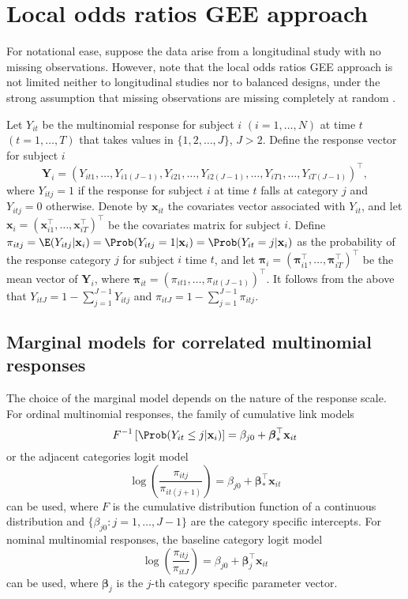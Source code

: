 \documentclass[article,shortnames,nojss]{jss}
\begin{document}
\section{Local odds ratios GEE approach} \label{GEENotation}
For notational ease, suppose the data arise from a longitudinal study with no missing observations. However, note that the local odds ratios GEE approach is not limited neither to longitudinal studies nor to balanced designs, under the strong assumption that missing observations are missing completely at random \citep{Rubin1976}.

Let $Y_{it}$ be the multinomial response for subject $i$ $(i=1,\ldots,N)$ at time $t$ $(t=1,\ldots,T)$ that takes values in $\{1,2,\ldots,J\}$, $J>2$. Define the response vector for subject $i$
$$\mathbf {Y}_{i}=(Y_{it1},\ldots,Y_{i1(J-1)},Y_{i21},\ldots,Y_{i2(J-1)},\ldots,Y_{iT1},\ldots,Y_{iT(J-1)})^{\top},$$ 
where $Y_{itj}=1$ if the response for subject $i$ at time $t$ falls at category $j$ and $Y_{itj}=0$ otherwise. Denote by $\mathbf{x}_{it}$ the covariates vector associated with $Y_{it}$, and let $\mathbf x_{i}=(\mathbf x^{\top}_{i1},\ldots,\mathbf x^{\top}_{iT})^{\top}$ be the covariates matrix for subject $i$. Define $\pi_{itj}= \E(Y_{itj}|\mathbf x_i)=\Prob(Y_{itj}=1| \mathbf x_i)=\Prob(Y_{it}=j| \mathbf x_i)$ as the probability of the response category $j$ for subject $i$ time $t$, and let $\boldsymbol \pi_{i}=(\boldsymbol \pi^{\top}_{i1},\ldots,\boldsymbol \pi^{\top}_{iT})^{\top}$ be the mean vector of $\mathbf Y_i$, where $\boldsymbol{\pi}_{it} = (\pi_{it1},\ldots,\pi_{it(J-1)})^{\top}$. It follows from the above that $Y_{itJ}=1-\sum_{j=1}^{J-1} Y_{itj}$ and $\pi_{itJ}=1-\sum_{j=1}^{J-1} \pi_{itj}$.

\subsection{Marginal models for correlated multinomial responses}
The choice of the marginal model depends on the nature of the response scale. For ordinal multinomial responses, the family of cumulative link models
\begin{equation}
F^{-1}\left[\Prob(Y_{it}\leq j|\mathbf x_i)\right]=\beta_{j0}+ {\boldsymbol \beta}_{\ast}^{\top} \mathbf{x}_{it}
\label{ABMCLM}
\end{equation}
or the adjacent categories logit model  
\begin{equation}
\log\left(\frac{\pi_{itj}}{\pi_{it(j+1)}} \right)=\beta_{j0}+ {\boldsymbol \beta}_{\ast}^{\top} \mathbf{x}_{it}
\label{ABMACLM}
\end{equation}
can be used, where $F$ is the cumulative distribution function of a continuous distribution and $\{\beta_{j0}:j=1,\ldots,J-1\}$ are the category specific intercepts. For nominal multinomial responses, the baseline category logit model
\begin{equation}
\log\left(\frac{\pi_{itj}}{\pi_{itJ}}\right)=\beta_{j0}+{\boldsymbol {\beta}}_{j}^{\top} \mathbf{x}_{it}
\label{ABMBCLM}
\end{equation}
can be used, where $\boldsymbol {\beta}_{j}$ is the $j$-th category specific parameter vector.
\end{document}
